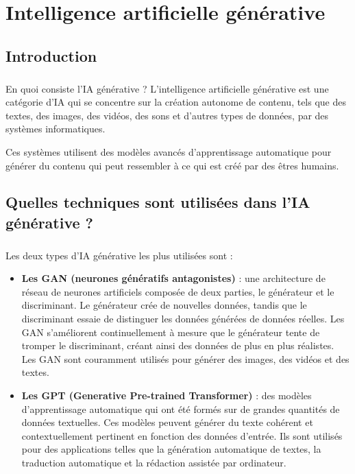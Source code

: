 \chapter{Intelligence artificielle générative}
\section*{Introduction}
\paragraph{}
En quoi consiste l’IA générative ? L'intelligence artificielle générative est
une catégorie d'IA qui se concentre sur la création autonome de contenu, tels que
des textes, des images, des vidéos, des sons et d'autres types de données, par des
systèmes informatiques.

Ces systèmes utilisent des modèles avancés d'apprentissage automatique pour générer
du contenu qui peut ressembler à ce qui est créé par des êtres humains.
\section{Quelles techniques sont utilisées dans l’IA générative ?}
\paragraph{}
Les deux types d'IA générative les plus utilisées sont :

\begin{itemize}
	\item \textbf{Les GAN (neurones génératifs antagonistes)} : une architecture
		de réseau de neurones artificiels composée de deux parties, le générateur et
		le discriminant. Le générateur crée de nouvelles données, tandis que le discriminant
		essaie de distinguer les données générées de données réelles. Les GAN s'améliorent
		continuellement à mesure que le générateur tente de tromper le discriminant,
		créant ainsi des données de plus en plus réalistes. Les GAN sont couramment
		utilisés pour générer des images, des vidéos et des textes.

	\item \textbf{Les GPT (Generative Pre-trained Transformer)} : des modèles d'apprentissage
		automatique qui ont été formés sur de grandes quantités de données
		textuelles. Ces modèles peuvent générer du texte cohérent et contextuellement
		pertinent en fonction des données d'entrée. Ils sont utilisés pour des
		applications telles que la génération automatique de textes, la traduction automatique
		et la rédaction assistée par ordinateur.
\end{itemize}

